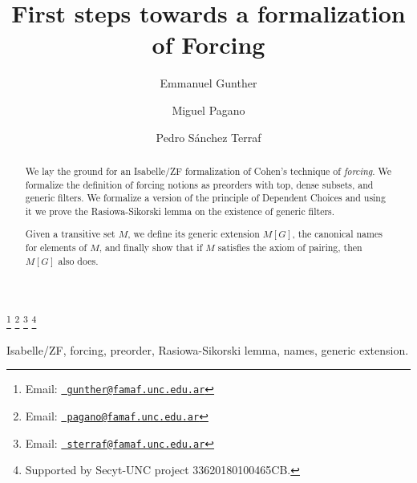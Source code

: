 \documentclass[9pt]{entcs} \usepackage{entcsmacro}
\begin{document}
\begin{frontmatter}
  \title{First steps towards a formalization of Forcing}
  \author{Emmanuel Gunther%
    }
  \address{FaMAF\\ Universidad Nacional de C\'ordoba\\
    C\'ordoba, Argentina} \author{Miguel Pagano}
  \address{FaMAF\\Universidad Nacional de C\'ordoba\\
    C\'ordoba, Argentina}
  \author{Pedro S\'anchez Terraf}
  \address{CIEM-FaMAF\\Universidad Nacional de C\'ordoba\\
    C\'ordoba, Argentina}
 \thanks[myemail]{Email:
    \href{mailto:gunther@famaf.unc.edu.ar} {\texttt{\normalshape
        gunther@famaf.unc.edu.ar}}} \thanks[coemail]{Email:
    \href{mailto:pagano@famaf.unc.edu.ar} {\texttt{\normalshape
        pagano@famaf.unc.edu.ar}}}  \thanks[co2email]{Email:
    \href{mailto:sterraf@famaf.unc.edu.ar} {\texttt{\normalshape
        sterraf@famaf.unc.edu.ar}}} 
 \thanks[ALL]{Supported by Secyt-UNC project 33620180100465CB.} 
\begin{abstract} 
  We lay the ground for an Isabelle/ZF formalization of Cohen's technique of
  \emph{forcing}. We formalize the definition of forcing notions as
  preorders with top, dense subsets, and generic filters. We formalize
  a version of the principle of Dependent Choices and using it
  we prove the Rasiowa-Sikorski lemma on the existence of generic filters.
  
  Given a transitive set $M$, we define its generic extension $M[G]$,
  the canonical names for elements of $M$, and finally show that if $M$
  satisfies the axiom of pairing, then $M[G]$ also does.
\end{abstract}
\begin{keyword}
Isabelle/ZF, forcing, preorder, Rasiowa-Sikorski lemma, names, generic extension.
\end{keyword}
\end{frontmatter}
























\end{document}
